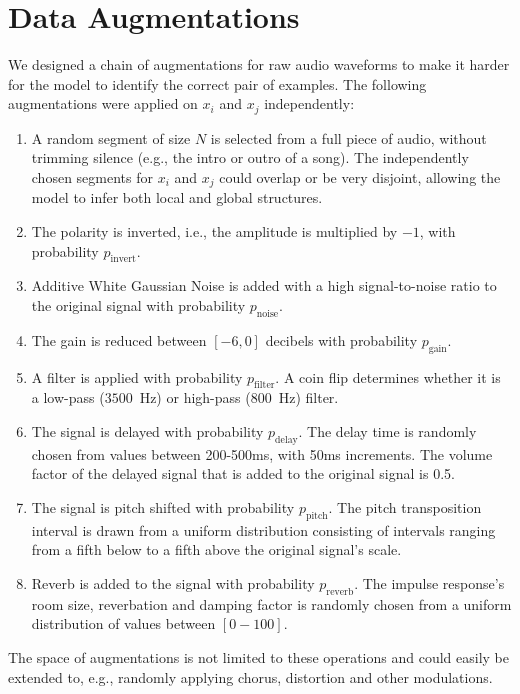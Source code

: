 \section{Data Augmentations}
We designed a chain of augmentations for raw audio waveforms to make it harder for the model to identify the correct pair of examples. The following augmentations were applied on ${x_i}$ and ${x_j}$ independently:
\begin{enumerate}
    \item A random segment of size $N$ is selected from a full piece of audio, without trimming silence (e.g., the intro or outro of a song). The independently chosen segments for $x_i$ and $x_j$ could overlap or be very disjoint, allowing the model to infer both local and global structures.
    \item The polarity is inverted, i.e., the amplitude is multiplied by $-1$, with probability $p_{\mathrm{invert}}$.
    \item Additive White Gaussian Noise is added with a high signal-to-noise ratio to the original signal with probability $p_{\mathrm{noise}}$.
    \item The gain is reduced between $[-6, 0]$ decibels with probability $p_{\mathrm{gain}}$.
    \item A filter is applied with probability $p_{\mathrm{filter}}$. A coin flip determines whether it is a low-pass ($3500$~Hz) or high-pass ($800$~Hz) filter.
    \item The signal is delayed with probability $p_{\mathrm{delay}}$. The delay time is randomly chosen from values between 200-500ms, with 50ms increments. The volume factor of the delayed signal that is added to the original signal is 0.5.
    \item The signal is pitch shifted with probability $p_{\mathrm{pitch}}$. The pitch transposition interval is drawn from a uniform distribution consisting of intervals ranging from a fifth below to a fifth above the original signal's scale.
    \item Reverb is added to the signal with probability $p_{\mathrm{reverb}}$. The impulse response's room size, reverbation and damping factor is randomly chosen from a uniform distribution of values between $[0-100]$.
\end{enumerate}
The space of augmentations is not limited to these operations and could easily be extended to, e.g., randomly applying chorus, distortion and other modulations.


